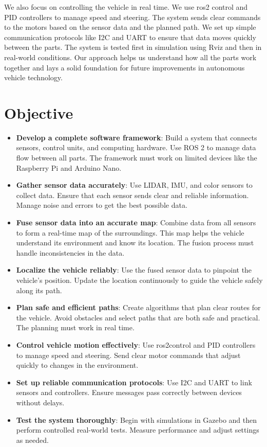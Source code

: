 \documentclass[english,project]{buwthesis}
\begin{document}
We also focus on controlling the vehicle in real time. We use ros2 control and PID controllers to manage speed and steering. The system sends clear commands to the motors based on the sensor data and the planned path. We set up simple communication protocols like I2C and UART to ensure that data moves quickly between the parts. The system is tested first in simulation using Rviz and then in real-world conditions. Our approach helps us understand how all the parts work together and lays a solid foundation for future improvements in autonomous vehicle technology.

\section{Objective}
\begin{itemize}


\item \textbf{Develop a complete software framework}:
Build a system that connects sensors, control units, and computing hardware. Use ROS 2 to manage data flow between all parts. The framework must work on limited devices like the Raspberry Pi and Arduino Nano.
\item \textbf{Gather sensor data accurately}:
Use LIDAR, IMU, and color sensors to collect data. Ensure that each sensor sends clear and reliable information. Manage noise and errors to get the best possible data.
\item \textbf{Fuse sensor data into an accurate map}:
Combine data from all sensors to form a real-time map of the surroundings. This map helps the vehicle understand its environment and know its location. The fusion process must handle inconsistencies in the data.
\item \textbf{Localize the vehicle reliably}:
Use the fused sensor data to pinpoint the vehicle's position. Update the location continuously to guide the vehicle safely along its path.
\item \textbf{Plan safe and efficient paths}:
Create algorithms that plan clear routes for the vehicle. Avoid obstacles and select paths that are both safe and practical. The planning must work in real time.
\item \textbf{Control vehicle motion effectively}:
Use ros2control and PID controllers to manage speed and steering. Send clear motor commands that adjust quickly to changes in the environment.
\item \textbf{Set up reliable communication protocols}:
Use I2C and UART to link sensors and controllers. Ensure messages pass correctly between devices without delays.
\item \textbf{Test the system thoroughly}:
Begin with simulations in Gazebo and then perform controlled real-world tests. Measure performance and adjust settings as needed.


\end{itemize}
\end{document}
